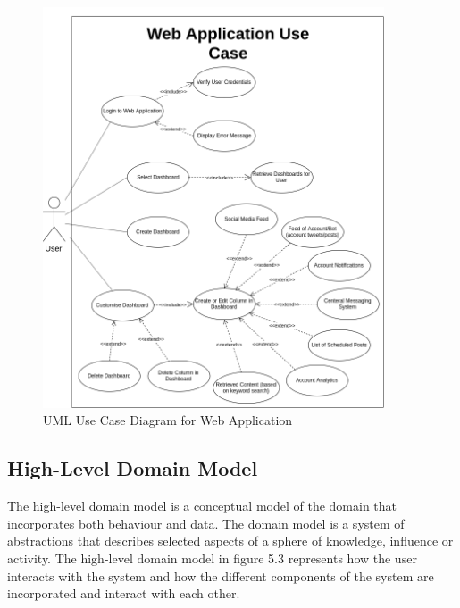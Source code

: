 \begin{figure}[H]
  \centering
  \includegraphics[width=0.9\textwidth]{images/usecasewebapp-2.png}
  \caption{UML Use Case Diagram for Web Application}
\end{figure}

\subsection{High-Level Domain Model}

The high-level domain model is a conceptual model of the domain that incorporates both behaviour and data. The domain model is a system of abstractions that describes selected aspects of a sphere of knowledge, influence or activity. The high-level domain model in figure 5.3 represents how the user interacts with the system and how the different components of the system are incorporated and interact with each other.


